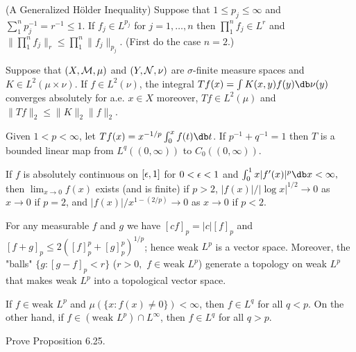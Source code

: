 \documentclass[12pt, a4paper]{article}
\begin{document}
\begin{problem}\label{prob:6-31}
(A Generalized Hölder Inequality) Suppose that $1\le p_{j}\le\infty$ and $\sum_{1}^{n}p_{j}^{-1}=r^{-1}\le1$. If $f_{j}\in L^{p_{j}}$ for $j=1,\ldots,n$ then $\prod_{1}^{n}f_{j}\in L^{r}$ and $\|\prod_{1}^{n}f_{j}\|_{r}\le\prod_{1}^{n}\|f_{j}\|_{p_{j}}$. (First do the case $n=2$.)
\end{problem}

\begin{problem}\label{prob:6-32}
Suppose that $(X,\mathcal{M},\mu)$ and $(Y,\mathcal{N},\nu)$ are $\sigma$-finite measure spaces and $K\in L^{2}(\mu\times\nu)$. If $f\in L^{2}(\nu)$, the integral $Tf(x)=\int K(x,y)f(y)\db\nu(y)$ converges absolutely for a.e. $x\in X$ moreover, $Tf\in L^{2}(\mu)$ and $\|Tf\|_{2}\le\|K\|_{2}\|f\|_{2}$.
\end{problem}

\begin{problem}\label{prob:6-33}
Given $1<p<\infty$, let $Tf(x)=x^{-1/p}\int_{0}^{x}f(t)\db t$. If $p^{-1}+q^{-1}=1$ then $T$ is a bounded linear map from $L^{q}((0,\infty))$ to $C_{0}((0,\infty))$.
\end{problem}

\begin{problem}\label{prob:6-34}
If $f$ is absolutely continuous on $[\epsilon,1]$ for $0<\epsilon<1$ and $\int_{0}^{1}x|f^{\prime}(x)|^{p}\db x<\infty,$ then $\lim_{x\rightarrow0}f(x)$ exists (and is finite) if $p>2$, $|f(x)|/|\log x|^{1/2}\rightarrow0$ as $x\rightarrow0$ if $p=2$, and $|f(x)|/x^{1-(2/p)}\rightarrow0$ as $x\rightarrow0$ if $p<2$.
\end{problem}

\begin{problem}\label{prob:6-35}
For any measurable $f$ and $g$ we have $[cf]_{p}=|c|[f]_{p}$ and $[f+g]_{p}\le2([f]_{p}^{p}+[g]_{p}^{p})^{1/p}$; hence weak $L^{p}$ is a vector space. Moreover, the "balls" $\{g:[g-f]_{p}<r\}$ ($r>0,$ $f\in\text{weak } L^{p}$) generate a topology on weak $L^{p}$ that makes weak $L^{p}$ into a topological vector space.
\end{problem}

\begin{problem}\label{prob:6-36}
If $f\in\text{weak } L^{p}$ and $\mu(\{x:f(x)\ne0\})<\infty$, then $f\in L^{q}$ for all $q<p.$ On the other hand, if $f\in(\text{weak } L^{p})\cap L^{\infty}$, then $f\in L^{q}$ for all $q>p$.
\end{problem}

\begin{problem}\label{prob:6-37}
Prove Proposition 6.25.
\end{problem}
\end{document}
